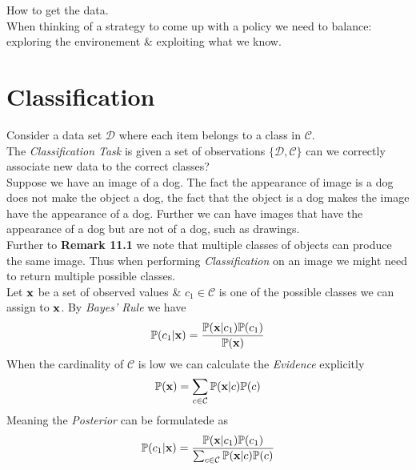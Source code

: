 \documentclass[11pt,a4paper]{article}
\begin{document}
How to get the data.\\

When thinking of a strategy to come up with a policy we need to balance: exploring the environement \& exploiting what we know.

\section{Classification}

Consider a data set $\mathcal{D}$ where each item belongs to a class in $\mathcal{C}$.\\
The \textit{Classification Task} is given a set of observations $\{\mathcal{D,C}\}$ can we correctly associate new data to the correct classes?\\

Suppose we have an image of a dog. The fact the appearance of image is a dog does not make the object a dog, the fact that the object is a dog makes the image have the appearance of a dog. Further we can have images that have the appearance of a dog but are not of a dog, such as drawings.\\

Further to \textbf{Remark 11.1} we note that multiple classes of objects can produce the same image. Thus when performing \textit{Classification} on an image we might need to return multiple possible classes.\\

Let $\textbf{x}$ be a set of observed values \& $c_1\in\mathcal{C}$ is one of the possible classes we can assign to $\textbf{x}$. By \textit{Bayes' Rule} we have
$$\mathbb{P}(c_1|\textbf{x})=\dfrac{\mathbb{P}(\textbf{x}|c_1)\mathbb{P}(c_1)}{\mathbb{P}(\textbf{x})}$$
When the cardinality of $\mathcal{C}$ is low we can calculate the \textit{Evidence} explicitly
$$\mathbb{P}(\textbf{x})=\sum_{c\in\mathcal{C}}\mathbb{P}(\textbf{x}|c)\mathbb{P}(c)$$
Meaning the \textit{Posterior} can be formulatede as
$$\mathbb{P}(c_1|\textbf{x})=\frac{\mathbb{P}(\textbf{x}|c_1)\mathbb{P}(c_1)}{\sum_{c\in\mathcal{C}}\mathbb{P}(\textbf{x}|c)\mathbb{P}(c)}$$
\end{document}
